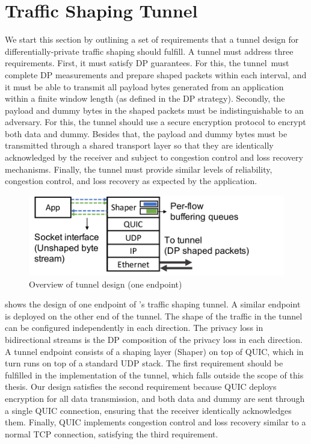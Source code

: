\section{Traffic Shaping Tunnel}\label{sec:tunnel-overview}
We start this section by outlining a set of requirements that a tunnel design for differentially-private traffic shaping should fulfill.
A tunnel must address three requirements.
First, it must satisfy DP guarantees. 
For this, the tunnel~must complete DP measurements and prepare shaped packets within each interval, and it must be able to transmit all payload bytes generated from an application within a finite window length (as defined in the DP strategy).
%
Secondly, the payload and dummy bytes in the shaped packets must be indistinguishable to an adversary.
For this, the tunnel should use a secure encryption protocol to encrypt both data and dummy.
Besides that, the payload and dummy bytes must be transmitted through a shared transport layer so that they are identically acknowledged by the receiver and subject to congestion control and loss recovery mechanisms.
%
Finally, the tunnel must provide similar levels of reliability, congestion control, and loss recovery as expected by the application.
\begin{figure}[t]
  \centering
  \includegraphics[width=\columnwidth]{figures/design2.pdf}
  \caption{Overview of tunnel design (one endpoint)
  }
  \label{fig:minesvpn-overview}
\end{figure}
 shows the design of one endpoint of {\sys}’s traffic shaping tunnel. A similar endpoint is deployed on the other end of the tunnel.
The shape of the traffic in the tunnel can be configured independently in each direction. The privacy loss in bidirectional streams is the DP composition of the privacy loss in each direction.
A tunnel endpoint consists of a shaping layer (Shaper) on top of QUIC, which in turn runs on top of a standard UDP stack. 
The first requirement should be fulfilled in the implementation of the tunnel, which falls outside the scope of this thesis.
Our design satisfies the second requirement because QUIC deploys encryption for all data transmission, and both data and dummy are sent through a single QUIC connection, ensuring that the receiver identically acknowledges them. 
Finally, QUIC implements congestion control and loss recovery similar to a normal TCP connection, satisfying the third requirement.

